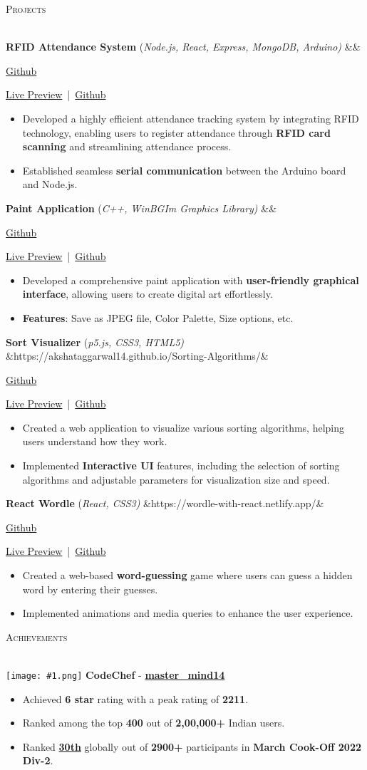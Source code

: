 \documentclass[a4paper]{article}
\newcommand{\tinyBulletSep} { \vspace{1.2mm} }
\newcommand{\bulletSep} { \vspace{2.2mm} }
\newcommand{\sectionSep} { \vspace{3mm} }
\newcommand{\lineunder} {
    \vspace*{-8pt} \\
    \hspace*{-15pt} \hrulefill \\
}
\newcommand{\header} [1] {
    {\hspace*{-18pt}\vspace*{6pt} {
        \fontfamily{qcs}\selectfont \large \scshape #1
    }}
    \vspace*{-6pt} \lineunder
    \vspace{0.5mm}
}
\newcommand{\linkFont}[1]{
    {\fontfamily{lmtt}\selectfont#1}
}
\newcommand{\link}[2]{
    {\fontfamily{lmtt}\selectfont\href{#1}{#2}}
}
\newcommand{\projectItem}[5]{
    {\textbf{#1}} {(\sl #2)}\hfill
    \ifx&#3&%
    \link{#4}{Github}\\
    \else
    \linkFont{\href{#3}{Live Preview}~|~\href{#4}{Github}}\\
    \fi
    \begin{itemize}
        #5
    \end{itemize}
}
\newcommand{\image}[1]{
    \begingroup
    \normalfont
    \Large
    \texttt{[image: \#1.png]}%
    \endgroup
}
\begin{document}

\header{Projects}

\projectItem{RFID Attendance System}{Node.js, React, Express, MongoDB, Arduino}{}{https://github.com/AkshatAggarwal14/RFID-Attendance-system}{
    \item Developed a highly efficient attendance tracking system by integrating RFID technology, enabling users to register attendance through \textbf{RFID card scanning} and streamlining attendance process.
    \item Established seamless \textbf{serial communication} between the Arduino board and Node.js.
}
\bulletSep

\projectItem{Paint Application}{C++, WinBGIm Graphics Library}{}{https://github.com/Sahil-187/Paint-Application}{
    \item Developed a comprehensive paint application with \textbf{user-friendly graphical interface}, allowing users to create digital art effortlessly.
    \item \textbf{Features}: Save as JPEG file, Color Palette, Size options, etc.
}
\bulletSep

\projectItem{Sort Visualizer}{p5.js, CSS3, HTML5}{https://akshataggarwal14.github.io/Sorting-Algorithms/}{https://github.com/AkshatAggarwal14/Sorting-Algorithms/}{
    \item Created a web application to visualize various sorting algorithms, helping users understand how they work.
    \item Implemented \textbf{Interactive UI} features, including the selection of sorting algorithms and adjustable parameters for visualization size and speed.
}\bulletSep

\projectItem{React Wordle}{React, CSS3}{https://wordle-with-react.netlify.app/}{https://github.com/AkshatAggarwal14/react-wordle}{
    \item Created a web-based \textbf{word-guessing} game where users can guess a hidden word by entering their guesses.
    \item Implemented animations and media queries to enhance the user experience.
}
\sectionSep


\header{Achievements}
\image{cc} \textbf{CodeChef} -\textbf{\link{https://www.codechef.com/users/master_mind14}{master\_mind14}}
\begin{itemize}
    \item Achieved \textbf{6 star} rating with a peak rating of \textbf{2211}.
    \item Ranked among the top \textbf{400} out of \textbf{2,00,000+} Indian users.
    \item Ranked\textbf{\link{https://www.codechef.com/rankings/COOK139B?itemsPerPage=100&order=asc&page=1&search=master_mind14&sortBy=rank}{30th}}globally out of \textbf{2900+} participants in \textbf{March Cook-Off 2022 Div-2}.
\end{itemize}
\tinyBulletSep
\end{document}
